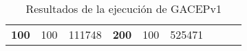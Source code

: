 \begin{table}[H]
\begin{tabular}{|ccrccrccc}
\multicolumn{1}{|c|}{\multirow{-39}{*}{\cellcolor[HTML]{FFFFC7}\textbf{100}}} & \multicolumn{1}{c|}{\multirow{-9}{*}{\cellcolor[HTML]{DDFDFF}100}} & \multicolumn{1}{r|}{\cellcolor[HTML]{DAE8FC}111748}    & \multicolumn{1}{c|}{\multirow{-39}{*}{\cellcolor[HTML]{FFFFC7}\textbf{200}}} & \multicolumn{1}{c|}{\multirow{-10}{*}{\cellcolor[HTML]{DDFDFF}100}} & \multicolumn{1}{r|}{\cellcolor[HTML]{DDFDFF}525471}    &                                                                              &                                                                    &                                                        \\ \cline{1-6}
\end{tabular}
\caption{\label{GACEPv1}Resultados de la ejecución de GACEPv1}
\end{table}


